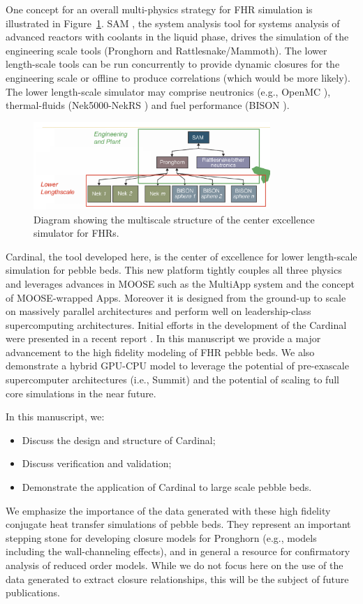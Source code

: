 One concept for an overall multi-physics strategy for FHR simulation is illustrated in Figure~\ref{f:fhr1}. SAM \cite{hu2017sam}, the system analysis tool for systems analysis of advanced reactors with coolants in the liquid phase, drives the simulation of the engineering scale tools (Pronghorn and Rattlesnake/Mammoth). The lower length-scale tools can be run concurrently to provide dynamic closures for the engineering scale or offline to produce correlations (which would be more likely). The lower length-scale simulator may comprise neutronics (e.g., OpenMC \cite{romano2013openmc}), thermal-fluids (Nek5000-NekRS \cite{fischer2008}) and fuel performance (BISON \cite{hales2013triso}).

\begin{figure}[!h]
\centering
\includegraphics[clip=true,width=0.8\textwidth]{Figures/fhr_graph}
\caption{Diagram showing the multiscale structure of the center excellence simulator for FHRs.}
\label{f:fhr1}
\end{figure}

Cardinal, the tool developed here, is the center of excellence for lower length-scale simulation for pebble beds. This new platform tightly couples all three physics and leverages advances in MOOSE \cite{gaston2009moose} such as the MultiApp system and the concept of MOOSE-wrapped Apps. Moreover it is designed from the ground-up to scale on massively parallel architectures and perform well on leadership-class supercomputing architectures. Initial efforts in the development of the Cardinal were presented in a recent report \cite{cardinal}. In this manuscript we provide a major advancement to the high fidelity modeling of FHR pebble beds. We also demonstrate a hybrid GPU-CPU model to leverage the potential of pre-exascale supercomputer architectures (i.e., Summit) and the potential of scaling to full core simulations in the near future.

In this manuscript, we:
\begin{itemize}
\item Discuss the design and structure of Cardinal;
\item Discuss verification and validation;
\item Demonstrate the application of Cardinal to large scale pebble beds.
\end{itemize}

We emphasize the importance of the data generated with these high fidelity conjugate heat transfer simulations of pebble beds. They represent an important stepping stone for developing closure models for Pronghorn (e.g., models including the wall-channeling effects), and in general a resource for confirmatory analysis of reduced order models. While we do not focus here on the use of the data generated to extract closure relationships, this will be the subject of future publications.
